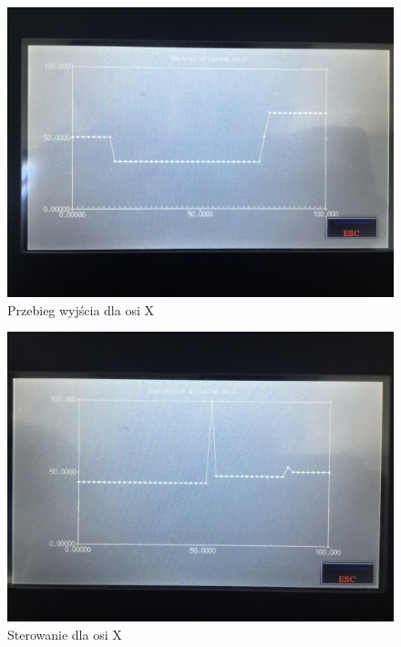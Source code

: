 \begin{figure}[H]
    \label{Wykresy::output_x}
    \centering
    \includegraphics[scale=0.15]{./sections/inteco/images/output_x.jpg}
    \caption{Przebieg wyjścia dla osi X}
\end{figure}

\begin{figure}[H]
    \label{Wykres::input_x}
    \centering
    \includegraphics[scale=0.15]{./sections/inteco/images/input_x.jpg}
    \caption{Sterowanie dla osi X}
\end{figure}

